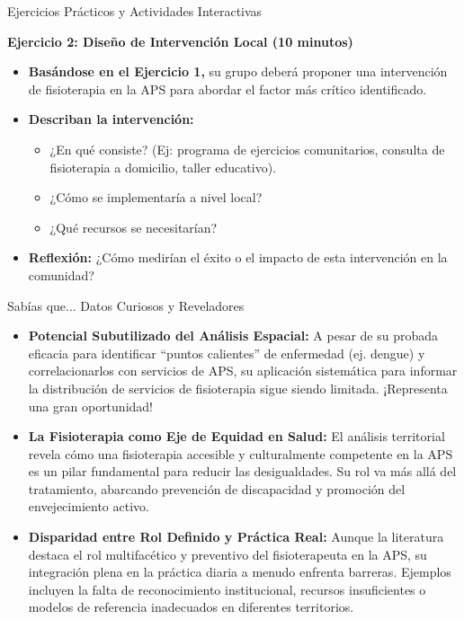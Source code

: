 \documentclass[aspectratio=169]{beamer}
\begin{document}
\begin{frame}{Ejercicios Prácticos y Actividades Interactivas}


\textbf{Ejercicio 2: Diseño de Intervención Local (10 minutos)}
\begin{itemize}
  \item \textbf{Basándose en el Ejercicio 1,} su grupo deberá proponer una intervención de fisioterapia en la APS para abordar el factor más crítico identificado.
  \item \textbf{Describan la intervención:}
  \begin{itemize}
    \item ¿En qué consiste? (Ej: programa de ejercicios comunitarios, consulta de fisioterapia a domicilio, taller educativo).
    \item ¿Cómo se implementaría a nivel local?
    \item ¿Qué recursos se necesitarían?
  \end{itemize}
  \item \textbf{Reflexión:} ¿Cómo medirían el éxito o el impacto de esta intervención en la comunidad?
\end{itemize}
\end{frame}

\begin{frame}{Sabías que... Datos Curiosos y Reveladores}


\begin{itemize}
  \item \textbf{Potencial Subutilizado del Análisis Espacial:} A pesar de su probada eficacia para identificar ``puntos calientes'' de enfermedad (ej. dengue) y correlacionarlos con servicios de APS, su aplicación sistemática para informar la distribución de servicios de fisioterapia sigue siendo limitada. ¡Representa una gran oportunidad!
  \item \textbf{La Fisioterapia como Eje de Equidad en Salud:} El análisis territorial revela cómo una fisioterapia accesible y culturalmente competente en la APS es un pilar fundamental para reducir las desigualdades. Su rol va más allá del tratamiento, abarcando prevención de discapacidad y promoción del envejecimiento activo.
  \item \textbf{Disparidad entre Rol Definido y Práctica Real:} Aunque la literatura destaca el rol multifacético y preventivo del fisioterapeuta en la APS, su integración plena en la práctica diaria a menudo enfrenta barreras. Ejemplos incluyen la falta de reconocimiento institucional, recursos insuficientes o modelos de referencia inadecuados en diferentes territorios.
\end{itemize}
\end{frame}
\end{document}
